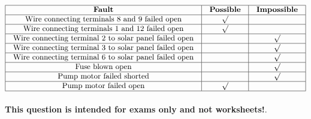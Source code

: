 






$$\vbox{\offinterlineskip
\halign{\strut
\vrule \quad\hfil # \ \hfil & 
\vrule \quad\hfil # \ \hfil & 
\vrule \quad\hfil # \ \hfil \vrule \cr
\noalign{\hrule}
%
{\bf Fault} & {\bf Possible} & {\bf Impossible} \cr
%
\noalign{\hrule}
%
Wire connecting terminals 8 and 9 failed open & $\surd$ &  \cr
%
\noalign{\hrule}
%
Wire connecting terminals 1 and 12 failed open & $\surd$ &  \cr
%
\noalign{\hrule}
%
Wire connecting terminal 2 to solar panel failed open &  & $\surd$ \cr
%
\noalign{\hrule}
%
Wire connecting terminal 3 to solar panel failed open &  & $\surd$ \cr
%
\noalign{\hrule}
%
Wire connecting terminal 6 to solar panel failed open &  & $\surd$ \cr
%
\noalign{\hrule}
%
Fuse blown open &  & $\surd$ \cr
%
\noalign{\hrule}
%
Pump motor failed shorted &  & $\surd$ \cr
%
\noalign{\hrule}
%
Pump motor failed open & $\surd$ &  \cr
%
\noalign{\hrule}
} %
}$$ %








{\bf This question is intended for exams only and not worksheets!}.



